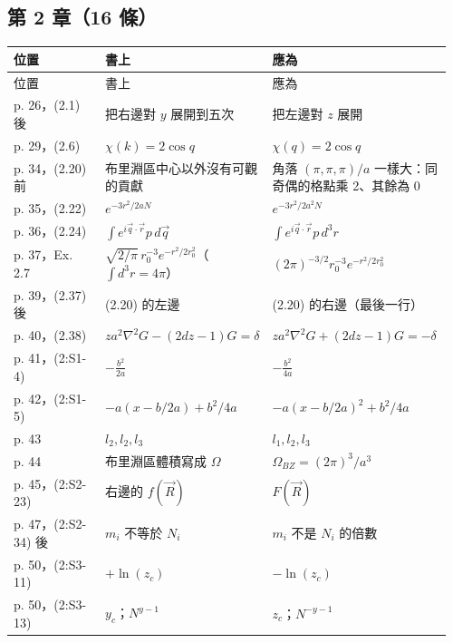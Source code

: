 \subsection{第 2 章（16 條）}
{\footnotesize\renewcommand{\arraystretch}{1.1}\setlength{\tabcolsep}{4pt}
\begin{longtable}{@{}>{\raggedright\arraybackslash}p{0.21\linewidth}>{\raggedright\arraybackslash}p{0.34\linewidth}>{\raggedright\arraybackslash}p{0.41\linewidth}@{}}
\toprule 位置 & 書上 & 應為\\ \midrule\endfirsthead
\toprule 位置 & 書上 & 應為\\ \midrule\endhead
\bottomrule\endfoot
p. 26，(2.1) 後 & 把右邊對 $y$ 展開到五次 & 把左邊對 $z$ 展開\\
p. 29，(2.6) & $\chi(k)=2\cos q$ & $\chi(q)=2\cos q$\\
p. 34，(2.20) 前 & 布里淵區中心以外沒有可觀的貢獻 & 角落 $(\pi,\pi,\pi)/a$ 一樣大：同奇偶的格點乘 2、其餘為 0\\
p. 35，(2.22) & $e^{-3r^2/2aN}$ & $e^{-3r^2/2a^2N}$\\
p. 36，(2.24) & $\int e^{i\vec q\cdot\vec r}p\,d\vec q$ & $\int e^{i\vec q\cdot\vec r}p\,d^3r$\\
p. 37，Ex. 2.7 & $\sqrt{2/\pi}\,r_0^{-3}e^{-r^2/2r_0^2}$（$\int d^3r=4\pi$） & $(2\pi)^{-3/2}r_0^{-3}e^{-r^2/2r_0^2}$\\
p. 39，(2.37) 後 & (2.20) 的左邊 & (2.20) 的右邊（最後一行）\\
p. 40，(2.38) & $za^2\nabla^2G-(2dz-1)G=\delta$ & $za^2\nabla^2G+(2dz-1)G=-\delta$\\
p. 41，(2:S1-4) & $-\frac{b^2}{2a}$ & $-\frac{b^2}{4a}$\\
p. 42，(2:S1-5) & $-a(x-b/2a)+b^2/4a$ & $-a(x-b/2a)^2+b^2/4a$\\
p. 43 & $l_2,l_2,l_3$ & $l_1,l_2,l_3$\\
p. 44 & 布里淵區體積寫成 $\Omega$ & $\Omega_{BZ}=(2\pi)^3/a^3$\\
p. 45，(2:S2-23) & 右邊的 $f(\vec R)$ & $F(\vec R)$\\
p. 47，(2:S2-34) 後 & $m_i$ 不等於 $N_i$ & $m_i$ 不是 $N_i$ 的倍數\\
p. 50，(2:S3-11) & $+\ln(z_c)$ & $-\ln(z_c)$\\
p. 50，(2:S3-13) & $y_c$；$N^{y-1}$ & $z_c$；$N^{-y-1}$\\
\end{longtable}}

